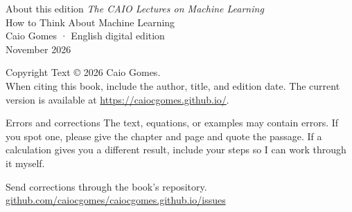 \begin{quadro}{About this edition}
\emph{The CAIO Lectures on Machine Learning}\\
How to Think About Machine Learning\\
Caio Gomes · English digital edition\\
November 2026
\end{quadro}

\begin{quadro}{Copyright}
Text © 2026 Caio Gomes.\\
When citing this book, include the author, title, and edition date. The current version is available at \url{https://caiocgomes.github.io/}.
\end{quadro}

\begin{quadro}{Errors and corrections}
The text, equations, or examples may contain errors. If you spot one, please give the chapter and page and quote the passage. If a calculation gives you a different result, include your steps so I can work through it myself.

Send corrections through the book’s repository.\\
\href{https://github.com/caiocgomes/caiocgomes.github.io/issues}{github.com/caiocgomes/caiocgomes.github.io/issues}
\end{quadro}
